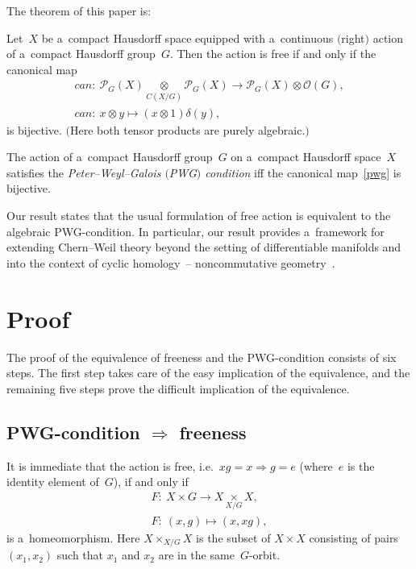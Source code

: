 \documentclass[pdftex]{sigma}
\begin{document}
The theorem of this paper is:

\begin{theorem}\label{theoGal}
Let~$X$ be a~compact Hausdorff space equipped with a~continuous $($right$)$ action of a~compact Hausdorff group~$G$.
Then the action is free if and only if the canonical map
\begin{gather}
{can} \colon \ \mathcal{P}_G(X)\underset{C(X/G)}{\otimes} \mathcal{P}_G(X) \longrightarrow \mathcal{P}_G(X)\otimes
\mathcal{O}(G),
\nonumber
\\
{can}\colon \ x\otimes y \longmapsto (x\otimes 1)\delta(y),
\label{pwg}
\end{gather}
is bijective.
$($Here both tensor products are purely algebraic.$)$
\end{theorem}
\begin{definition}
The action of a~compact Hausdorf\/f group~$G$ on a~compact Hausdorf\/f space~$X$ satisf\/ies the \emph{Peter--Weyl--Galois
$($PWG$)$ condition} if\/f the canonical map~\eqref{pwg} is bijective.
\end{definition}
\noindent Our result states that the usual formulation of free action is equivalent to the algebraic PWG-condition.
In particular, our result provides a~framework for extending Chern--Weil theory beyond the setting of dif\/ferentiable
manifolds and into the context of cyclic homology~--
noncommutative geometry~\cite{bh04}.

\section{Proof}

The proof of the equivalence of freeness and the PWG-condition consists of six steps.
The f\/irst step takes care of the easy implication of the equivalence, and the remaining f\/ive steps prove the dif\/f\/icult
implication of the equivalence.

\subsection[PWG-condition $\Rightarrow$ freeness]{PWG-condition $\boldsymbol{\Rightarrow}$ freeness}

It is immediate that the action is free, i.e.\ $xg=x \Longrightarrow g=e$ (where~$e$ is the identity element of~$G$), if
and only if
\begin{gather*}
F\colon \  X
\times
G  \longrightarrow X\underset{X/G}{
\times
}X,
\\
F\colon \  (x,g)  \longmapsto (x,xg),
\end{gather*}
is a~homeomorphism.
Here $X
\times
_{X/G}X$ is the subset of $X
\times
X$ consisting of pairs $(x_1, x_2)$ such that $x_1$ and $x_2$ are in the same~$G$-orbit.
\end{document}
